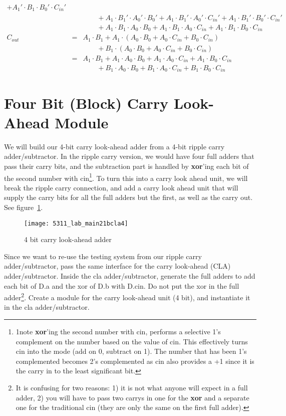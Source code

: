 \begin{example}
{\begin{eqnarray*}
          + A_1' \cdot B_1 \cdot B_0'\cdot C_{in}' \\
    & & \qquad
          + A_1 \cdot B_1' \cdot A_0'\cdot B_0' + A_1 \cdot B_1' \cdot A_0'\cdot C_{in}'
          + A_1 \cdot B_1' \cdot B_0'\cdot C_{in}' \\
    & & \qquad
          + A_1 \cdot B_1 \cdot A_0\cdot B_0 + A_1 \cdot B_1 \cdot A_0\cdot C_{in}
           + A_1 \cdot B_1 \cdot B_0\cdot C_{in} \\
C_{out} & = & A_1 \cdot B_1 + A_1 \cdot (A_0\cdot B_0 + A_0\cdot C_{in} + B_0\cdot C_{in}) \\
   & & \qquad + B_1 \cdot (A_0\cdot B_0 + A_0\cdot C_{in} + B_0\cdot C_{in}) \\
    & = & A_1 \cdot B_1 + A_1 \cdot A_0\cdot B_0 + A_1 \cdot A_0\cdot C_{in} + A_1 \cdot B_0\cdot C_{in} \\
   & & \qquad + B_1 \cdot A_0\cdot B_0 + B_1 \cdot A_0\cdot C_{in} + B_1 \cdot B_0\cdot C_{in}
\end{eqnarray*}
}
\end{example}

\section{Four Bit (Block) Carry Look-Ahead Module}

We will build our 4-bit carry look-ahead adder from a 4-bit ripple carry adder/subtractor. In the ripple carry version, we would have four full adders that pass their carry bits, and the subtraction part is handled by \textbf{xor}'ing each bit of the second number with cin\footnote{1note \textbf{xor}'ing the second number with cin, performs a selective 1's complement on the number based on the value of cin. This effectively turns cin into the mode (add on 0, subtract on 1). The number that has been 1's complemented becomes 2's complemented as cin also provides a +1 since it is the carry in to the least significant bit.}. To turn this into a carry look ahead unit, we will break the ripple carry connection, and add a carry look ahead unit that will supply the carry bits for all the full adders but the first, as well as the carry out. See figure~\ref{fig-4bitcla}.

\begin{figure}
  \centering
  \texttt{[image: 5311\_lab\_main21bcla4]}
  \caption{4 bit carry look-ahead adder}\label{fig-4bitcla}
\end{figure}

Since we want to re-use the testing system from our ripple carry adder/subtractor, pass the same interface for the carry look-ahead (CLA) adder/subtractor. Inside the cla adder/subtractor, generate the full adders to add each bit of D.a and the xor of D.b with D.cin. Do not put the xor in the full adder\footnote{It is confusing for two reasons: 1) it is not what anyone will expect in a full adder, 2) you will have to pass two carrys in one for the \textbf{xor} and a separate one for the traditional cin (they are only the same on the first full adder).}. Create a module for the carry look-ahead unit (4 bit), and instantiate it in the cla adder/subtractor.

